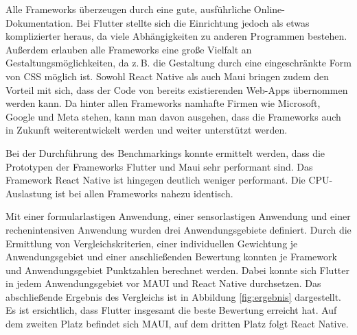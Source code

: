 \documentclass[]{lni}
\begin{document}
Alle Frameworks überzeugen durch eine gute, ausführliche Online-Dokumentation. Bei Flutter stellte sich die Einrichtung jedoch als etwas komplizierter heraus, da viele Abhängigkeiten zu anderen Programmen bestehen. Außerdem erlauben alle Frameworks eine große Vielfalt an Gestaltungsmöglichkeiten, da z.\,B. die Gestaltung durch eine eingeschränkte Form von CSS möglich ist. Sowohl React Native als auch Maui bringen zudem den Vorteil mit sich, dass der Code von bereits existierenden Web-Apps übernommen werden kann. Da hinter allen Frameworks namhafte Firmen wie Microsoft, Google und Meta stehen, kann man davon ausgehen, dass die Frameworks auch in Zukunft weiterentwickelt werden und weiter unterstützt werden.

Bei der Durchführung des Benchmarkings konnte ermittelt werden, dass die Prototypen der Frameworks Flutter und Maui sehr performant sind. Das Framework React Native ist hingegen deutlich weniger performant. Die CPU-Auslastung ist bei allen Frameworks nahezu identisch.

Mit einer formularlastigen Anwendung, einer sensorlastigen Anwendung und einer rechenintensiven Anwendung wurden drei Anwendungsgebiete definiert. Durch die Ermittlung von Vergleichskriterien, einer individuellen Gewichtung je Anwendungsgebiet und einer anschließenden Bewertung konnten je Framework und Anwendungsgebiet Punktzahlen berechnet werden. Dabei konnte sich Flutter in jedem Anwendungsgebiet vor MAUI und React Native durchsetzen. Das abschließende Ergebnis des Vergleichs ist in Abbildung \ref{fig:ergebnis} dargestellt. Es ist ersichtlich, dass Flutter insgesamt die beste Bewertung erreicht hat. Auf dem zweiten Platz befindet sich MAUI, auf dem dritten Platz folgt React Native.

\clearpage

\printbibliography %
\end{document}
